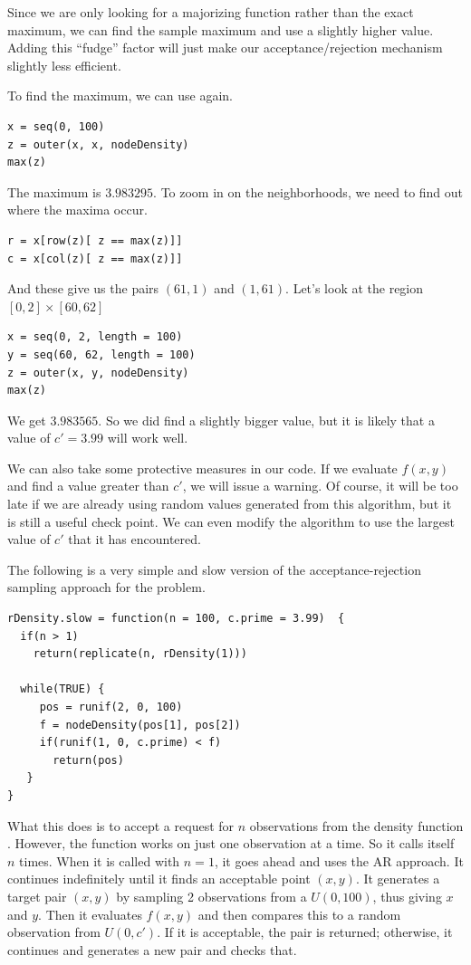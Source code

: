 Since we are only looking for a majorizing function rather than the
exact maximum, we can find the sample maximum and use a slightly
higher value.  Adding this ``fudge'' factor will just make our
acceptance/rejection mechanism slightly less efficient.

To find the maximum, we can use
 again.
{\footnotesize{
\begin{verbatim}
x = seq(0, 100)
z = outer(x, x, nodeDensity)
max(z)
\end{verbatim}
}}

The maximum is $ 3.983295$.
To zoom in on the neighborhoods,
we need to find out where the maxima occur.
\begin{verbatim}
r = x[row(z)[ z == max(z)]]
c = x[col(z)[ z == max(z)]]
\end{verbatim}
And these give us 
the pairs
$(61, 1)$ and $(1, 61)$.
Let's look at the region $[0, 2] \times [60, 62]$
\begin{verbatim}
x = seq(0, 2, length = 100)
y = seq(60, 62, length = 100)
z = outer(x, y, nodeDensity)
max(z)
\end{verbatim}
We get $3.983565$.  So we did find a slightly bigger value, but it is
likely that a value of $c' = 3.99$ will work well.

We can also take some protective measures in our code.  If we evaluate
$f(x, y)$ and find a value greater than $c'$, we will issue a
warning. Of course, it will be too late if we are already using random
values generated from this algorithm, but it is still a useful check
point.  We can even modify the algorithm to use the largest value of
$c'$ that it has encountered.


The following is a very simple and slow version of the
acceptance-rejection sampling approach for the problem.
{\footnotesize{
\begin{verbatim}
rDensity.slow = function(n = 100, c.prime = 3.99)  {
  if(n > 1)
    return(replicate(n, rDensity(1)))

  while(TRUE) {
     pos = runif(2, 0, 100)
     f = nodeDensity(pos[1], pos[2])
     if(runif(1, 0, c.prime) < f)
       return(pos)
   }
}
\end{verbatim}
}}
What this does is to accept a request for $n$ observations from the
density function .  However, the function works
on just one observation at a time. So it calls itself $n$ times.  When
it is called with $n = 1$, it goes ahead and uses the AR approach.  It
continues indefinitely until it finds an acceptable point $(x, y)$.
It generates a target pair $(x, y)$ by sampling 2 observations from a
$U(0, 100)$, thus giving $x$ and $y$.  Then it evaluates $f(x, y)$ and
then compares this to a random observation from $U(0, c')$.  If it is
acceptable, the pair is returned; otherwise, it continues and
generates a new pair and checks that.


